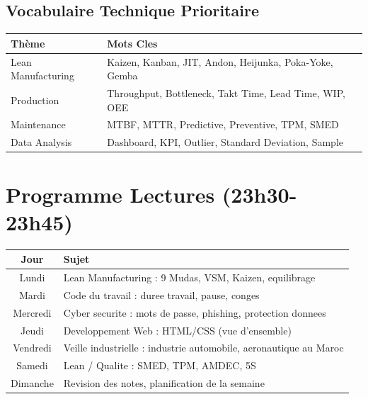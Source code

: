 \documentclass[12pt,a4paper]{article}
\begin{document}
\subsection*{Vocabulaire Technique Prioritaire}

\begin{table}[h]
\centering
\small
\begin{tabular}{|l|p{7cm}|}
\hline
\rowcolor{gray!20}
\textbf{Thème} & \textbf{Mots Cles} \\
\hline
Lean Manufacturing & Kaizen, Kanban, JIT, Andon, Heijunka, Poka-Yoke, Gemba \\
Production & Throughput, Bottleneck, Takt Time, Lead Time, WIP, OEE \\
Maintenance & MTBF, MTTR, Predictive, Preventive, TPM, SMED \\
Data Analysis & Dashboard, KPI, Outlier, Standard Deviation, Sample \\
\hline
\end{tabular}
\end{table}

\newpage

\section{Programme Lectures (23h30-23h45)}

\begin{table}[h]
\centering
\begin{tabular}{|c|p{10cm}|}
\hline
\rowcolor{gray!20}
\textbf{Jour} & \textbf{Sujet} \\
\hline
Lundi & Lean Manufacturing : 9 Mudas, VSM, Kaizen, equilibrage \\
Mardi & Code du travail : duree travail, pause, conges \\
Mercredi & Cyber securite : mots de passe, phishing, protection donnees \\
Jeudi & Developpement Web : HTML/CSS (vue d'ensemble) \\
Vendredi & Veille industrielle : industrie automobile, aeronautique au Maroc \\
Samedi & Lean / Qualite : SMED, TPM, AMDEC, 5S \\
Dimanche & Revision des notes, planification de la semaine \\
\hline
\end{tabular}
\end{table}

\newpage
\end{document}

